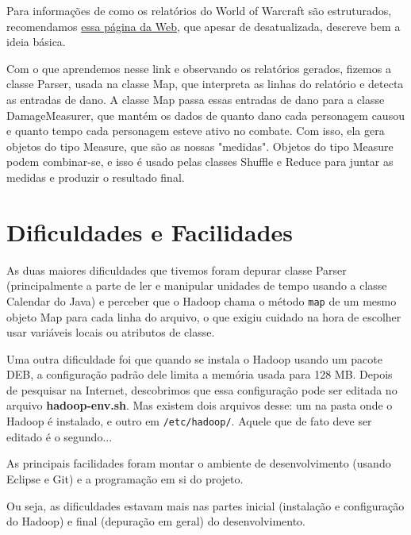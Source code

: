 \documentclass[a4paper,11pt]{article}
\begin{document}
  Para informações de como os relatórios do World of Warcraft são estruturados,
  recomendamos \href{http://www.wowwiki.com/API_COMBAT_LOG_EVENT}{essa página da
  Web}, que apesar de desatualizada, descreve bem a ideia básica.
  
  Com o que aprendemos nesse link e observando os relatórios gerados, fizemos a
  classe Parser, usada na classe Map, que interpreta as linhas do relatório e
  detecta as entradas de dano. A classe Map passa essas entradas de dano para
  a classe DamageMeasurer, que mantém os dados de quanto dano cada personagem
  causou e quanto tempo cada personagem esteve ativo no combate. Com isso, ela
  gera objetos do tipo Measure, que são as nossas "medidas". Objetos do tipo
  Measure podem combinar-se, e isso é usado pelas classes Shuffle e Reduce para
  juntar as medidas e produzir o resultado final.
  
\section{Dificuldades e Facilidades}

  As duas maiores dificuldades que tivemos foram depurar classe Parser
  (principalmente a parte de ler e manipular unidades de tempo usando a classe
  Calendar do Java) e perceber que o Hadoop chama o método \verb$map$ de um
  mesmo objeto Map para cada linha do arquivo, o que exigiu cuidado na hora de
  escolher usar variáveis locais ou atributos de classe.
  
  Uma outra dificuldade foi que quando se instala o Hadoop usando um pacote DEB,
  a configuração padrão dele limita a memória usada para 128 MB. Depois de
  pesquisar na Internet, descobrimos que essa configuração pode ser editada no
  arquivo \textbf{hadoop-env.sh}. Mas existem dois arquivos desse: um na pasta
  onde o Hadoop é instalado, e outro em \verb$/etc/hadoop/$. Aquele que de fato
  deve ser editado é o segundo...
  
  As principais facilidades foram montar o ambiente de desenvolvimento (usando
  Eclipse e Git) e a programação em si do projeto.
  
  Ou seja, as dificuldades estavam mais nas partes inicial (instalação e
  configuração do Hadoop) e final (depuração em geral) do desenvolvimento.
\end{document}
